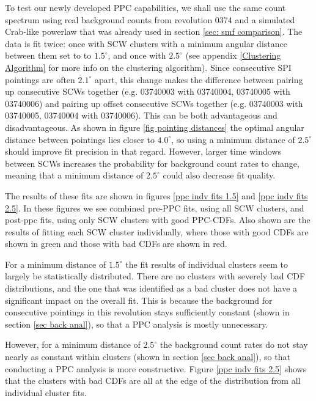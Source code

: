 \documentclass{report}
\begin{document}
To test our newly developed PPC capabilities, we shall use the same count spectrum using real background counts from revolution 0374 and a simulated Crab-like powerlaw that was already used in section \ref{sec: smf comparison}. The data is fit twice: once with SCW clusters with a minimum angular distance between them set to to $1.5^\circ$, and once with $2.5^\circ$ (see appendix \ref{Clustering Algorithm} for more info on the clustering algorithm). Since consecutive SPI pointings are often $2.1^\circ$ apart, this change makes the difference between pairing up consecutive SCWs together (e.g. 03740003 with 03740004, 03740005 with 03740006) and pairing up offset consecutive SCWs together (e.g. 03740003 with 03740005, 03740004 with 03740006). This can be both advantageous and disadvantageous. As shown in figure \ref{fig pointing distances} the optimal angular distance between pointings lies closer to $4.0^\circ$, so using a minimum distance of $2.5^\circ$ should improve fit precision in that regard. However, larger time windows between SCWs increases the probability for background count rates to change, meaning that a minimum distance of $2.5^\circ$ could also decrease fit quality. 

The results of these fits are shown in figures \ref{ppc indv fits 1.5} and \ref{ppc indv fits 2.5}. In these figures we see combined pre-PPC fits, using all SCW clusters, and post-ppc fits, using only SCW clusters with good PPC-CDFs. Also shown are the results of fitting each SCW cluster individually, where those with good CDFs are shown in green and those with bad CDFs are shown in red. 

For a minimum distance of $1.5^\circ$ the fit results of individual clusters seem to largely be statistically distributed. There are no clusters with severely bad CDF distributions, and the one that was identified as a bad cluster does not have a significant impact on the overall fit. This is because the background for consecutive pointings in this revolution stays sufficiently constant (shown in section \ref{sec back anal}), so that a PPC analysis is mostly unnecessary.

However, for a minimum distance of $2.5^\circ$ the background count rates do not stay nearly as constant within clusters (shown in section \ref{sec back anal}), so that conducting a PPC analysis is more constructive. Figure \ref{ppc indv fits 2.5} shows that the clusters with bad CDFs are all at the edge of the distribution from all individual cluster fits.
\end{document}
